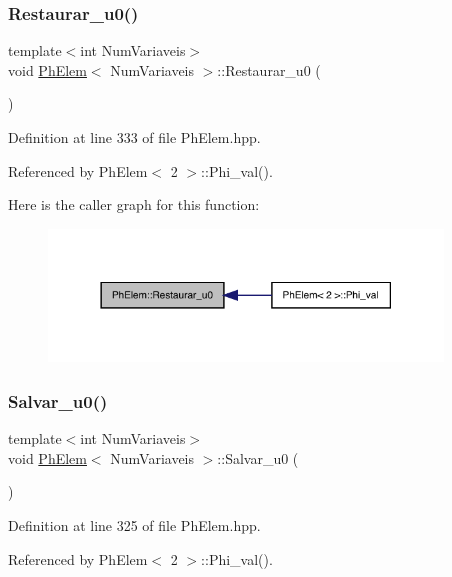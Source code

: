\subsubsection{\texorpdfstring{Restaurar\+\_\+u0()}{Restaurar\_u0()}}
{\footnotesize\ttfamily template$<$int Num\+Variaveis$>$ \\
void \hyperlink{classPhElem}{Ph\+Elem}$<$ Num\+Variaveis $>$\+::Restaurar\+\_\+u0 (\begin{DoxyParamCaption}{ }\end{DoxyParamCaption})}



Definition at line 333 of file Ph\+Elem.\+hpp.



Referenced by Ph\+Elem$<$ 2 $>$\+::\+Phi\+\_\+val().

Here is the caller graph for this function\+:
\nopagebreak
\begin{figure}[H]
\begin{center}
\leavevmode
\includegraphics[width=297pt]{classPhElem_a7094a0e8767868c583cc948e56214a9d_icgraph}
\end{center}
\end{figure}
\mbox{\label{classPhElem_ab6765ea1fa41b3a2d565d86872d6e7e6}} 
\subsubsection{\texorpdfstring{Salvar\+\_\+u0()}{Salvar\_u0()}}
{\footnotesize\ttfamily template$<$int Num\+Variaveis$>$ \\
void \hyperlink{classPhElem}{Ph\+Elem}$<$ Num\+Variaveis $>$\+::Salvar\+\_\+u0 (\begin{DoxyParamCaption}{ }\end{DoxyParamCaption})}



Definition at line 325 of file Ph\+Elem.\+hpp.



Referenced by Ph\+Elem$<$ 2 $>$\+::\+Phi\+\_\+val().

